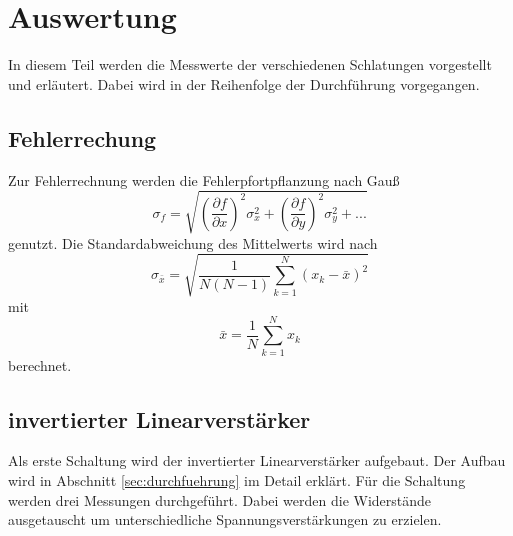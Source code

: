 \section{Auswertung}
\label{sec:auswertung}
In diesem Teil werden die Messwerte der verschiedenen Schlatungen vorgestellt und erläutert.
Dabei wird in der Reihenfolge der Durchführung vorgegangen.
\subsection{Fehlerrechung}
Zur Fehlerrechnung werden die Fehlerpfortpflanzung nach Gauß
\begin{equation}
    \sigma_f = \sqrt{\left(\frac{\partial f}{\partial x}\right)^2 \sigma_x ^2 + \left( \frac{\partial f}{\partial y}\right)^2 \sigma_y ^2 + ...}
\end{equation}
genutzt.
Die Standardabweichung des Mittelwerts wird nach
\begin{equation}
    \sigma_{\bar{x}} = \sqrt{\frac{1}{N(N-1)} \sum_{k=1}^N (x_k - \bar{x})^2}
\end{equation}
mit 
\begin{equation}
    \bar{x} = \frac{1}{N} \sum_{k=1} ^N x_k
\end{equation}
berechnet.
\subsection{invertierter Linearverstärker}
Als erste Schaltung wird der invertierter Linearverstärker aufgebaut.
Der Aufbau wird in Abschnitt \ref{sec:durchfuehrung} im Detail erklärt.
Für die Schaltung werden drei Messungen durchgeführt.
Dabei werden die Widerstände ausgetauscht um unterschiedliche Spannungsverstärkungen zu erzielen.

